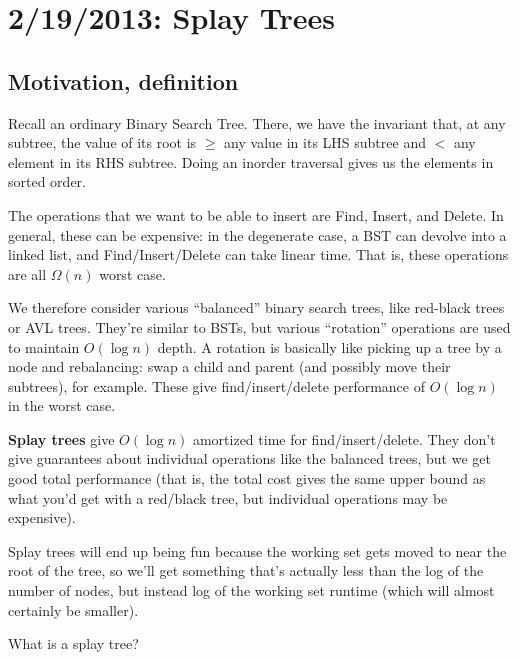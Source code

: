 \documentclass{article}
\begin{document}
\section{2/19/2013: Splay Trees}

\subsection{Motivation, definition}

Recall an ordinary Binary Search Tree. 
There, we have the invariant that, at any subtree, the value of its root
is $\geq$ any value in its LHS subtree and $<$ any element in its RHS subtree.
Doing an inorder traversal gives us the elements in sorted order.

The operations that we want to be able to insert are Find, Insert, and Delete.
In general, these can be expensive: in the degenerate case, a BST can 
devolve into a linked list, and Find/Insert/Delete can take linear time.
That is, these operations are all $\Omega(n)$ worst case.

We therefore consider various ``balanced'' binary search trees, like
red-black trees or AVL trees.
They're similar to BSTs, but various ``rotation'' operations are used to
maintain $O(\log n)$ depth.
A rotation is basically like picking up a tree by a node and rebalancing:
swap a child and parent (and possibly move their subtrees), for example.
These give find/insert/delete performance of $O(\log n)$ in the worst case.

\textbf{Splay trees} give $O(\log n)$ amortized time for find/insert/delete.
They don't give guarantees about individual operations like the balanced
trees, but we get good total performance (that is, the total cost gives the
same upper bound as what you'd get with a red/black tree, but individual 
operations may be expensive).

Splay trees will end up being fun because the working set gets moved
to near the root of the tree, so we'll get something that's actually
less than the log of the number of nodes, but instead log of the working
set runtime (which will almost certainly be smaller).

What is a splay tree?
\end{document}
